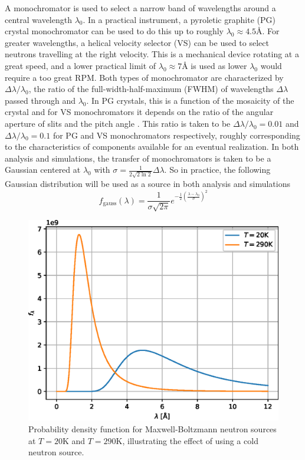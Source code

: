 \documentclass{article}
\begin{document}
A monochromator is used to select a narrow band of wavelengths around a central wavelength $\lambda_0$. In a practical instrument, a pyroletic graphite (PG) crystal monochromator can be used to do this up to roughly $\lambda_0 \approx 4.5 $Å. For greater wavelengths, a helical velocity selector (VS)\cite{szewc2010} can be used to select neutrons travelling at the right velocity. This is a mechanical device rotating at a great speed, and a lower practical limit of $\lambda_0 \approx 7$Å is used as lower $\lambda_0$ would require a too great RPM. Both types of monochromator are characterized by $\Delta\lambda/\lambda_0$, the ratio of the full-width-half-maximum (FWHM) of wavelengths $\Delta\lambda$ passed through and $\lambda_0$. In PG crystals, this is a function of the mosaicity of the crystal \cite{shapiro1972} and for VS monochromators it depends on the ratio of the angular aperture of slits and the pitch angle \cite{szewc2010}. This ratio is taken to be $\Delta\lambda/\lambda_0 = 0.01$ and $\Delta\lambda/\lambda_0 = 0.1$ for PG and VS monochromators respectively, roughly corresponding to the characteristics of components available for an eventual realization. In both analysis and simulations, the transfer of monochromators is taken to be a Gaussian centered at $\lambda_0$ with $\sigma = \frac{1}{2\sqrt{2\ln 2}}\Delta\lambda$. So in practice, the following Gaussian distribution will be used as a source in both analysis and simulations
\begin{equation}
	f_\text{gauss}(\lambda) = \frac{1}{\sigma\sqrt{2\pi}} e^{-\frac{1}{2}(\frac{\lambda - \lambda_0}{\sigma})^2} \label{eq:gauss-spectrum}
\end{equation}
\begin{figure}
	\centering
	\includegraphics[width=0.5\linewidth]{source-spectrum}
	\caption{Probability density function for Maxwell-Boltzmann neutron sources at $T = 20 \unit{\kelvin}$ and $T = 290 \unit{\kelvin}$, illustrating the effect of using a cold neutron source.}
	\label{fig:source-spectrum}
\end{figure}
\end{document}
